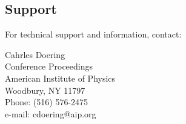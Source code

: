 \subsection{Support}

For technical support and information, contact:

\parindent0pt

\vskip8pt
Cahrles Doering \\Conference Proceedings\\
American Institute of Physics\\
Woodbury, NY 11797\\[4pt]
Phone: (516) 576-2475\\
e-mail: cdoering@aip.org
 






